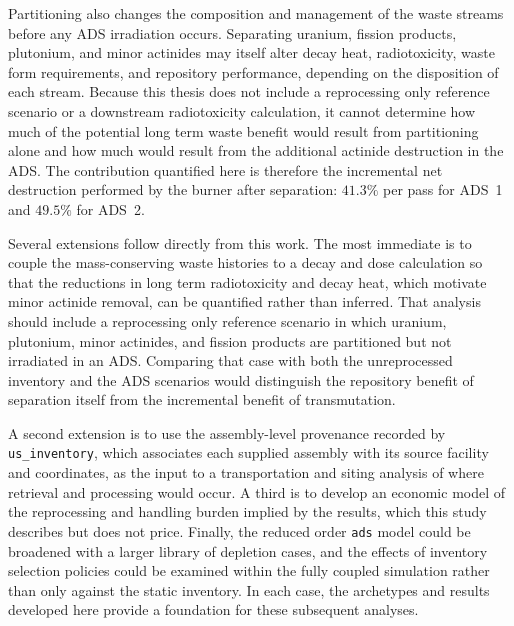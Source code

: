 Partitioning also changes the composition and management of the waste streams
before any ADS irradiation occurs. Separating uranium, fission products,
plutonium, and minor actinides may itself alter decay heat, radiotoxicity, waste
form requirements, and repository performance, depending on the disposition
of each stream. Because this thesis does not include a reprocessing only
reference scenario or a downstream radiotoxicity calculation, it cannot
determine how much of the potential long term waste benefit would result from
partitioning alone and how much would result from the additional actinide
destruction in the ADS. The contribution quantified here is therefore the
incremental net destruction performed by the burner after separation:
\(41.3\%\) per pass for ADS~1 and \(49.5\%\) for ADS~2.

Several extensions follow directly from this work. The most immediate is to
couple the mass-conserving waste histories to a decay and dose calculation so
that the reductions in long term radiotoxicity and decay heat, which motivate
minor actinide removal, can be quantified rather than inferred. That analysis
should include a reprocessing only reference scenario in which uranium,
plutonium, minor actinides, and fission products are partitioned but not
irradiated in an ADS. Comparing that case with both the unreprocessed inventory
and the ADS scenarios would distinguish the repository benefit of separation
itself from the incremental benefit of transmutation.

A second extension is to use the assembly-level provenance recorded by
\texttt{us\_inventory}, which associates each supplied assembly with its source
facility and coordinates, as the input to a transportation and siting analysis
of where retrieval and processing would occur. A third is to develop an
economic model of the reprocessing and handling burden implied by the results,
which this study describes but does not price. Finally, the reduced order
\texttt{ads} model could be broadened with a larger library of depletion cases,
and the effects of inventory selection policies could be examined within the
fully coupled simulation rather than only against the static inventory. In
each case, the archetypes and results developed here provide a foundation for
these subsequent analyses.